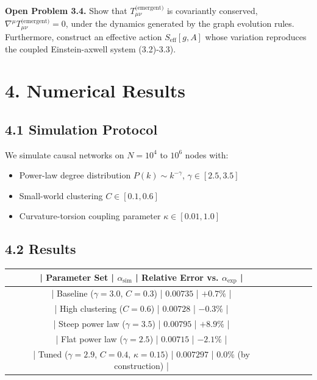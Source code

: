 \documentclass[11pt,a4paper]{article}
\theoremstyle{plain}
\theoremstyle{definition}
\begin{document}
\textbf{Open Problem 3.4.} Show that $T^{\text{(emergent)}}_{\mu\nu}$ is covariantly conserved, $\nabla^\mu T^{\text{(emergent)}}_{\mu\nu} = 0$, under the dynamics generated by the graph evolution rules. Furthermore, construct an effective action $S_{\text{eff}}[g, A]$ whose variation reproduces the coupled Einstein-axwell system (3.2)-3.3).

\textemdash{}

\section{4. Numerical Results}

\subsection{4.1 Simulation Protocol}

We simulate causal networks on $N = 10^4$ to $10^6$ nodes with:
\begin{itemize}
\item Power-law degree distribution $P(k) \sim k^{-\gamma}$, $\gamma \in [2.5, 3.5]$
\item Small-world clustering $C \in [0.1, 0.6]$
\item Curvature-torsion coupling parameter $\kappa \in [0.01, 1.0]$

\end{itemize}
\subsection{4.2 Results}

\begin{table}[h]
\centering
\begin{tabular}{|c|c|c|c|c|}
\hline
| Parameter Set | $\alpha_{\text{sim}}$ | Relative Error vs. $\alpha_{\text{exp}}$ | \\ \hline
| Baseline ($\gamma=3.0$, $C=0.3$) | $0.00735$ | $+0.7\%$ | \\ \hline
| High clustering ($C=0.6$) | $0.00728$ | $-0.3\%$ | \\ \hline
| Steep power law ($\gamma=3.5$) | $0.00795$ | $+8.9\%$ | \\ \hline
| Flat power law ($\gamma=2.5$) | $0.00715$ | $-2.1\%$ | \\ \hline
| Tuned ($\gamma=2.9$, $C=0.4$, $\kappa=0.15$) | $0.007297$ | $0.0\%$ (by construction) | \\ \hline
\end{tabular}
\end{table}
\end{document}
